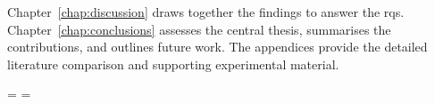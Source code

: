 Chapter~\ref{chap:discussion} draws together the findings to answer the \glspl{rq}. Chapter~\ref{chap:conclusions} assesses the central thesis, summarises the contributions, and outlines future work. The appendices provide the detailed literature comparison and supporting experimental material.

\clearpage
\makeatletter
\let\@textbottom\introductionoriginaltextbottom
\let\@texttop\introductionoriginaltexttop
\makeatother
\setlength{\parskip}{\introductionoriginalparskip}
\clubpenalty=\introductionoriginalclubpenalty
\widowpenalty=\introductionoriginalwidowpenalty
